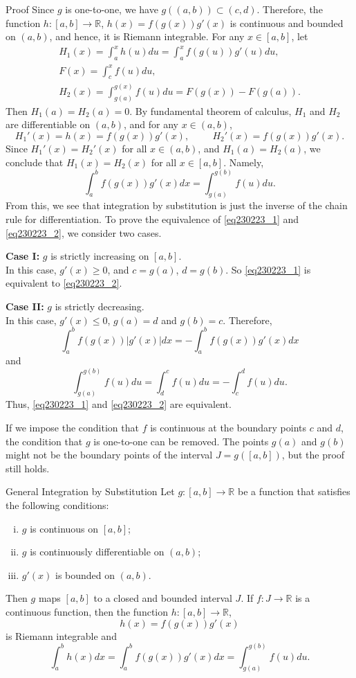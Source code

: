 \begin{example}[label=20230527]{}
\begin{myproof}{Proof}
Since $g$ is one-to-one, we have $g((a,b))\subset (c,d)$. Therefore, the function $h:[a,b]\to\mathbb{R}$, $h(x)=f(g(x))g'(x)$ is continuous and bounded on $(a,b)$, and hence, it is Riemann integrable.  For any $x\in [a,b]$, let
\begin{gather*}H_1(x) =\int_a^xh(u)du=\int_a^x f(g(u))g'(u)du,\\
F(x)=\int_c^xf(u)du,\\H_2(x) =\int_{g(a)}^{g(x)}f(u)du=F(g(x))-F(g(a)).\end{gather*}
Then $H_1(a)=H_2(a)=0$.
By fundamental theorem of calculus, $H_1$ and $H_2$ are differentiable on $(a,b)$, and for any $x\in (a,b)$,
\[H_1'(x)=h(x)=f(g(x))g'(x),\hspace{1cm} H_2'(x)=f(g(x))g'(x).\]
 Since $H_1'(x)=H_2'(x)$ for all $x\in (a,b)$, and $H_1(a)=H_2(a)$, we conclude that
$H_1(x)=H_2(x)$ for all $x\in [a,b]$. Namely,
\[\int_a^b f(g(x))g'(x)dx=\int_{g(a)}^{g(b)}f(u)du.\]
From this, we see that integration by substitution is just the inverse of the chain rule for differentiation.
To prove the equivalence of \eqref{eq230223_1} and \eqref{eq230223_2}, we consider two cases.

\textbf{Case I:}  $g$ is strictly increasing on $[a,b]$.\\In this case, $g'(x)\geq 0$, and $c=g(a)$, $d=g(b)$. So \eqref{eq230223_1} is equivalent to \eqref{eq230223_2}.

\textbf{Case II:} $g$ is strictly decreasing.\\In this case, $g'(x)\leq 0$, $g(a)=d$ and $g(b)=c$. Therefore,
\[\int_a^bf(g(x))|g'(x)|dx=-\int_a^bf(g(x))g'(x)dx\] and
\[\int_{g(a)}^{g(b)}f(u)du=\int_d^c f(u)du=-\int_c^df(u)du.\]Thus, \eqref{eq230223_1} and \eqref{eq230223_2} are equivalent.

\end{myproof}

  

If we impose the condition that $f$ is continuous at the boundary points $c$ and $d$, the condition that $g$ is one-to-one can be removed. The points $g(a)$ and $g(b)$ might not be the boundary points of the interval $J=g([a, b])$, but the proof still holds.
\begin{theorem}{General Integration by Substitution}
Let  $g:[a,b]\to\mathbb{R}$ be a function that satisfies the following conditions:
\begin{enumerate}[(i)]
\item $g$ is continuous  on $[a,b]$;
\item $g$  is continuously differentiable on $(a,b)$;
\item $g'(x)$ is bounded on $(a,b)$.
\end{enumerate}  Then $g$ maps $[a,b]$ to a closed and bounded  interval $J$.  If $f:J\to\mathbb{R}$ is a continuous  function, then the function $h:[a,b]\to \mathbb{R}$,
\[h(x)=f(g(x))g'(x)\]is  Riemann integrable and
\[\int_a^bh(x)dx=\int_a^b f(g(x))g'(x)dx=\int_{g(a)}^{g(b)}f(u)du.\]
 

\end{theorem}
\end{example}
